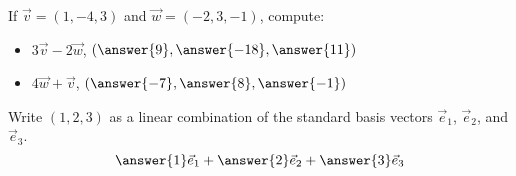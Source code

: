 \documentclass{ximera}
\begin{document}
\begin{exercise}
    If $\vec{v} = (1, -4, 3)$ and $\vec{w} = (-2, 3, -1)$, compute:
    \begin{itemize}
        \item $3\vec{v} - 2\vec{w}$, $\left(\answer{9}, \answer{-18}, \answer{11}\right)$
        \item $4\vec{w} + \vec{v}$, $\left(\answer{-7}, \answer{8}, \answer{-1}\right)$
    \end{itemize}
\end{exercise}

\begin{exercise}
    Write $(1,2,3)$ as a linear combination of the standard basis vectors $\vec{e}_1$, $\vec{e}_2$, and $\vec{e}_3$.
    \[
        \answer{1}\vec{e}_1 + \answer{2}\vec{e}_2 + \answer{3}\vec{e}_3
    \]
\end{exercise}
\end{document}

